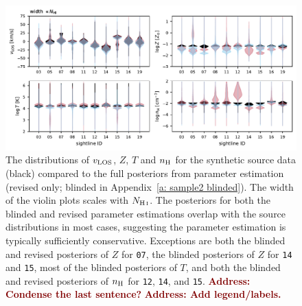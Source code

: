 \documentclass[fleqn,usenatbib]{mnras}
\newcommand{\todo}[1]{\textcolor{Maroon}{\textbf{Address: #1}}}
\begin{document}
\begin{figure}
    \centering
    \includegraphics[width=\textwidth]{figures/sample2/violin.pdf}
    \caption{
    The distributions of $v_{\rm LOS}$, $Z$, $T$ and $n_{\rm H}$ for the synthetic source data (black) compared to the full posteriors from parameter estimation (revised only; blinded in Appendix~\ref{a: sample2 blinded}).
    The width of the violin plots scales with $N_{\ion{H}{I}}$.
    The posteriors for both the blinded and revised parameter estimations overlap with the source distributions in most cases, suggesting the parameter estimation is typically sufficiently conservative.
    Exceptions are
    both the blinded and revised posteriors of $Z$ for \texttt{07},
    the blinded posteriors of $Z$ for \texttt{14} and \texttt{15},
    most of the blinded posteriors of $T$,
    and both the blinded and revised posteriors of $n_{\rm H}$ for \texttt{12}, \texttt{14}, and \texttt{15}.
    \todo{Condense the last sentence?}
    \todo{Add legend/labels.}
    }
    \label{f: sample2 violin}
\end{figure}
\end{document}
